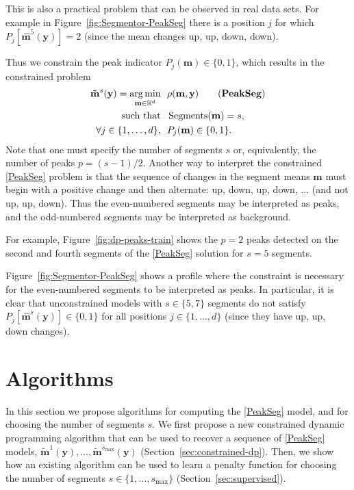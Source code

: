 \documentclass{article}
\DeclareMathOperator*{\argmin}{arg\,min}
\DeclareMathOperator*{\Segments}{Segments}
\newcommand{\RR}{\mathbb R}
\begin{document}
This is also a practical problem that can be observed in real data
sets. For example in Figure~\ref{fig:Segmentor-PeakSeg} there is a position $j$ for
which $P_j\left[ \mathbf{\hat m}^5(\mathbf y) \right]=2$ (since the
mean changes up, up, down, down). 

Thus we constrain the peak indicator $P_j(\mathbf
m)\in\{0, 1\}$, which results
in the constrained problem
\begin{align*}
  \label{PeakSeg}
  \mathbf{\tilde m}^s(\mathbf y)  =
    \argmin_{\mathbf m\in\RR^{d}} &\ \ 
    \rho(\mathbf m, \mathbf y) 
    \tag{\textbf{PeakSeg}}
\\
    \text{such that} &\ \  \Segments(\mathbf m)=s,  \\
     \forall j\in\{1, \dots, d\}, &\ \ P_j(\mathbf m) \in\{0, 1\}.
\end{align*}
Note that one must specify the number of segments $s$ or,
equivalently, the number of peaks $p=(s-1)/2$. Another way to
interpret the constrained \ref{PeakSeg} problem is that the sequence
of changes in the segment means $\mathbf m$ must begin with a positive
change and then alternate: up, down, up, down, ... (and not up, up,
down). Thus the even-numbered segments may be interpreted as peaks,
and the odd-numbered segments may be interpreted as background.

For example, Figure~\ref{fig:dp-peaks-train} shows the $p=2$ peaks
detected on the second and fourth segments of the \ref{PeakSeg}
solution for $s=5$ segments.

Figure~\ref{fig:Segmentor-PeakSeg} shows a profile where the constraint is
necessary for the even-numbered segments to be interpreted as
peaks. In particular, it is clear that unconstrained models with
$s\in\{5, 7\}$ segments do not satisfy $P_j[\mathbf{\hat m}^s(\mathbf
y)]\in\{0, 1\}$ for all positions $j\in\{1,\dots, d\}$ (since they
have up, up, down changes).

\section{Algorithms}
\label{sec:algorithms}

In this section we propose algorithms for computing the \ref{PeakSeg}
model, and for choosing the number of segments $s$. We first propose a
new constrained dynamic programming algorithm that can be used to
recover a sequence of \ref{PeakSeg} models, $\mathbf{\tilde
  m}^1(\mathbf y), \dots, \mathbf{\tilde m}^{s_{\text{max}}}(\mathbf
y)$ (Section~\ref{sec:constrained-dp}). Then, we show how an existing
algorithm can be used to learn a penalty function for choosing the
number of segments $s\in\{1, \dots, s_{\text{max}}\}$
(Section~\ref{sec:supervised}).
\end{document}
